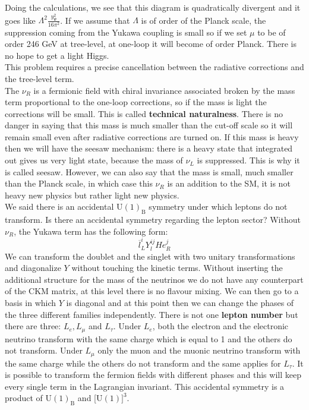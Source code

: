 \documentclass[../main.tex]{subfiles}
\begin{document}
Doing the calculations, we see that this diagram is quadratically divergent and it goes like $\Lambda^2\frac{y_\Psi^2}{16\pi^2}$. If we assume that $\Lambda$ is of order of the Planck scale, the suppression coming from the Yukawa coupling is small so if we set $\mu$ to be of order 246 GeV at tree-level, at one-loop it will become of order Planck. There is no hope to get a light Higgs.\\
This problem requires a precise cancellation between the radiative corrections and the tree-level term.\\
The $\nu_R$ is a fermionic field with chiral invariance associated broken by the mass term proportional to the one-loop corrections, so if the mass is light the corrections will be small. This is called \textbf{technical naturalness}. There is no danger in saying that this mass is much smaller than the cut-off scale so it will remain small even after radiative corrections are turned on. If this mass is heavy then we will have the seesaw mechanism: there is a heavy state that integrated out gives us very light state, because the mass of $\nu_L$ is suppressed. This is why it is called seesaw. However, we can also say that the mass is small, much smaller than the Planck scale, in which case this $\nu_R$ is an addition to the SM, it is not heavy new physics but rather light new physics.\\
We said there is an accidental U$(1)_{\text{B}}$ symmetry under which leptons do not transform. Is there an accidental symmetry regarding the lepton sector? Without $\nu_R$, the Yukawa term has the following form:
\[
\overline{l}_L^iY_l^{ij}He_R^j
\]
We can transform the doublet and the singlet with two unitary transformations and diagonalize $Y$ without touching the kinetic terms. Without inserting the additional structure for the mass of the neutrinos we do not have any counterpart of the CKM matrix, at this level there is no flavour mixing. We can then go to a basis in which $Y$ is diagonal and at this point then we can change the phases of the three different families independently. There is not one \textbf{lepton number} but there are three: $L_e, L_\mu$ and $L_\tau$. Under $L_e$, both the electron and the electronic neutrino transform with the same charge which is equal to 1 and the others do not transform. Under $L_\mu$ only the muon and the muonic neutrino transform with the same charge while the others do not transform and the same applies for $L_\tau$. It is possible to transform the fermion fields with different phases and this will keep every single term in the Lagrangian invariant. This accidental symmetry is a product of U$(1)_{\text{B}}$ and [U$(1)]^3$.\\
\end{document}
